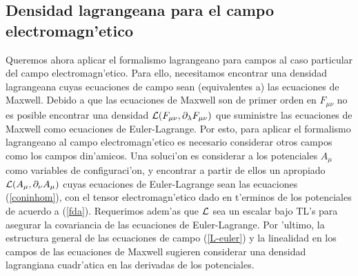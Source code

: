 \subsection{Densidad lagrangeana para el campo electromagn'etico}
Queremos ahora aplicar el formalismo lagrangeano para campos al caso particular
del campo electromagn'etico. Para ello, necesitamos encontrar una densidad
lagrangeana cuyas ecuaciones de campo sean (equivalentes a) las ecuaciones de
Maxwell. Debido a que las ecuaciones de Maxwell son de primer orden en
$F_{\mu\nu}$ no es posible encontrar una densidad ${\cal
L}(F_{\mu\nu},\partial_\lambda F_{\mu\nu})$ que suministre las ecuaciones de
Maxwell como ecuaciones de Euler-Lagrange. Por esto, para aplicar el formalismo
lagrangeano al campo electromagn'etico es necesario considerar otros campos como
los campos din'amicos. Una soluci'on es considerar a los potenciales $A_\mu$
como variables de configuraci'on, y encontrar a partir de ellos un apropiado
${\cal L}(A_\mu,\partial_\nu A_\mu)$ cuyas ecuaciones de Euler-Lagrange sean las
ecuaciones (\ref{coninhom}), con el tensor electromagn'etico dado en
t'erminos de los potenciales de acuerdo a (\ref{fda}). Requerimos
adem'as que $\cal L$ sea un escalar bajo TL's para asegurar la
covariancia de las ecuaciones de Euler-Lagrange. Por 'ultimo, la estructura
general de las ecuaciones de campo (\ref{L-euler}) y la linealidad en los campos
de las ecuaciones de Maxwell sugieren considerar una densidad lagrangiana
cuadr'atica en las derivadas de los potenciales.

